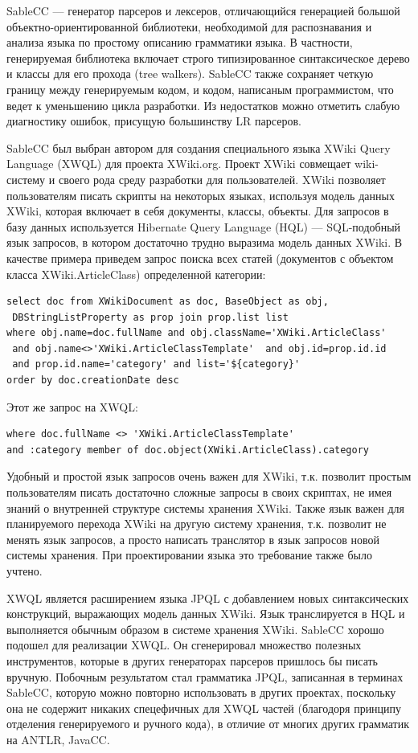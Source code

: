 \documentclass[a4paper,12pt,titlepage]{extarticle}
\begin{document}
SableCC --- генератор парсеров и лексеров, отличающийся генерацией большой
объектно-ориентированной библиотеки, необходимой для распознавания и анализа
языка по простому описанию грамматики языка. В частности, генерируемая
библиотека включает строго типизированное синтаксическое дерево и классы для
его прохода (tree walkers). SableCC  также сохраняет четкую границу между
генерируемым кодом, и кодом, написаным программистом, что ведет к уменьшению
цикла разработки. Из недостатков можно отметить слабую диагностику ошибок,
присущую большинству LR парсеров.

SableCC был выбран автором для создания специального языка XWiki Query Language
(XWQL) \cite{xwql} для проекта XWiki.org. Проект XWiki совмещает wiki-систему и
своего рода среду разработки для пользователей. XWiki позволяет пользователям
писать скрипты на некоторых языках, используя модель данных XWiki, которая
включает в себя документы, классы, объекты. Для запросов в базу данных
используется Hibernate Query Language (HQL) --- SQL-подобный язык запросов, в
котором достаточно трудно выразима модель данных XWiki. В качестве примера
приведем запрос поиска всех статей (документов с объектом класса
XWiki.ArticleClass) определенной категории:
\begin{verbatim}
select doc from XWikiDocument as doc, BaseObject as obj, 
 DBStringListProperty as prop join prop.list list
where obj.name=doc.fullName and obj.className='XWiki.ArticleClass' 
 and obj.name<>'XWiki.ArticleClassTemplate'  and obj.id=prop.id.id
 and prop.id.name='category' and list='${category}'
order by doc.creationDate desc
\end{verbatim}
Этот же запрос на XWQL:
\begin{verbatim}
where doc.fullName <> 'XWiki.ArticleClassTemplate' 
and :category member of doc.object(XWiki.ArticleClass).category
\end{verbatim}
Удобный и простой язык запросов очень важен для XWiki, т.к. позволит простым
пользователям писать достаточно сложные запросы в своих скриптах, не имея
знаний о внутренней структуре системы хранения XWiki. Также язык важен для
планируемого перехода XWiki на другую систему хранения, т.к. позволит не менять
язык запросов, а просто написать транслятор в язык запросов новой системы
хранения. При проектировании языка это требование также было учтено.

XWQL является расширением языка JPQL \cite{jpql} с добавлением новых
синтаксических конструкций, выражающих модель данных XWiki. Язык транслируется
в HQL и выполняется обычным образом в системе хранения XWiki. SableCC хорошо
подошел для реализации XWQL. Он сгенерировал множество полезных инструментов,
которые в других генераторах парсеров пришлось бы писать вручную. Побочным
результатом стал грамматика JPQL, записанная в терминах SableCC, которую можно
повторно использовать в других проектах, поскольку она не содержит никаких
спецефичных для XWQL частей (благодоря принципу отделения генерируемого и
ручного кода), в отличие от многих других грамматик на ANTLR, JavaCC.
\end{document}
